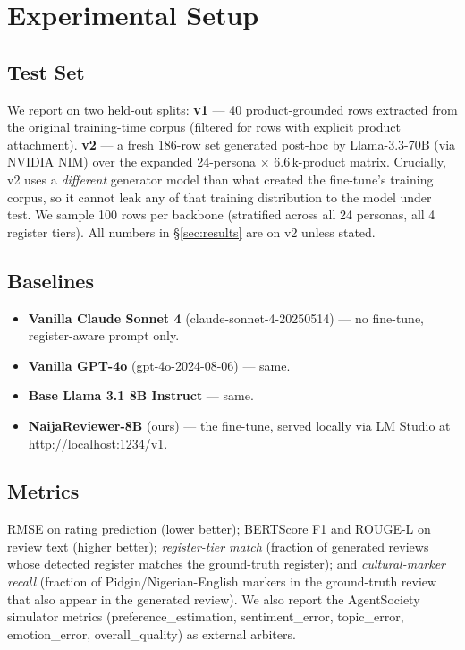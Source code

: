 \documentclass[sigconf,nonacm,balance]{acmart}
\begin{document}
\section{Experimental Setup}
\label{sec:experiments}

\subsection{Test Set}

We report on two held-out splits:
\textbf{v1} --- 40 product-grounded rows extracted from the original
training-time corpus (filtered for rows with explicit product attachment).
\textbf{v2} --- a fresh 186-row set generated post-hoc by Llama-3.3-70B
(via NVIDIA NIM) over the expanded 24-persona $\times$ 6.6\,k-product
matrix. Crucially, v2 uses a \emph{different} generator model than what
created the fine-tune's training corpus, so it cannot leak any of that
training distribution to the model under test. We sample 100 rows per
backbone (stratified across all 24 personas, all 4 register tiers). All
numbers in §\ref{sec:results} are on v2 unless stated.

\subsection{Baselines}

\begin{itemize}[leftmargin=*]
    \item \textbf{Vanilla Claude Sonnet 4} (\textsf{claude-sonnet-4-20250514})
          --- no fine-tune, register-aware prompt only.
    \item \textbf{Vanilla GPT-4o} (\textsf{gpt-4o-2024-08-06}) --- same.
    \item \textbf{Base Llama 3.1 8B Instruct} --- same.
    \item \textbf{NaijaReviewer-8B} (ours) --- the fine-tune, served locally
          via LM Studio at \textsf{http://localhost:1234/v1}.
\end{itemize}

\subsection{Metrics}

RMSE on rating prediction (lower better); BERTScore F1 and ROUGE-L on
review text (higher better); \emph{register-tier match} (fraction of
generated reviews whose detected register matches the ground-truth
register); and \emph{cultural-marker recall} (fraction of
Pidgin/Nigerian-English markers in the ground-truth review that also
appear in the generated review). We also report the AgentSociety
simulator metrics (\textsf{preference\_estimation},
\textsf{sentiment\_error}, \textsf{topic\_error},
\textsf{emotion\_error}, \textsf{overall\_quality}) as external arbiters.
\end{document}
